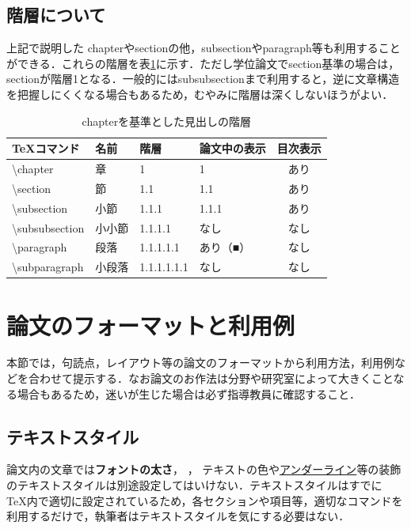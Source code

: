 \documentclass[uplatex,dvipdfmx,a4paper]{jsarticle}
\begin{document}
\subsection{階層について}
上記で説明した chapterやsectionの他，subsectionやparagraph等も利用することができる．これらの階層を表\ref{tab:kaisou}に示す．ただし学位論文でsection基準の場合は，sectionが階層1となる．一般的にはsubsubsectionまで利用すると，逆に文章構造を把握しにくくなる場合もあるため，むやみに階層は深くしないほうがよい．

\begin{table}[t]
  \caption{chapterを基準とした見出しの階層}
  \label{tab:kaisou}
  \centering
  \begin{tabular}{llllc} %
    \hline
    \TeX コマンド  & 名前  &  階層  & 論文中の表示 & 目次表示\\
    \hline \hline
    \textbackslash{chapter}  & 章   & 1 & 1 & あり\\
    \textbackslash{section}  & 節  & 1.1 & 1.1 & あり\\
    \textbackslash{subsection}  & 小節  & 1.1.1 & 1.1.1 & あり\\
    \textbackslash{subsubsection}  & 小小節  & 1.1.1.1 & なし & なし\\
    \textbackslash{paragraph}  & 段落  & 1.1.1.1.1 & あり（■） & なし\\
    \textbackslash{subparagraph}  & 小段落  & 1.1.1.1.1.1 & なし & なし\\
    \hline
  \end{tabular}
\end{table}


\section{論文のフォーマットと利用例}
本節では，句読点，レイアウト等の論文のフォーマットから利用方法，利用例などを合わせて提示する．なお論文のお作法は分野や研究室によって大きくことなる場合もあるため，迷いが生じた場合は必ず指導教員に確認すること．

\subsection{テキストスタイル}
論文内の文章では\textbf{フォントの太さ}， ， \textcolor[RGB]{200,70,120}{テキストの色}や\underline{アンダーライン}等の装飾のテキストスタイルは別途設定してはいけない．テキストスタイルはすでに \TeX 内で適切に設定されているため，各セクションや項目等，適切なコマンドを利用するだけで，執筆者はテキストスタイルを気にする必要はない．
\end{document}
